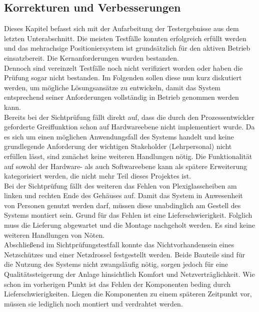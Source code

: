 \documentclass[../../../Bachelorarbeit.tex]{subfiles}
\begin{document}
\subsection{Korrekturen und Verbesserungen}
Dieses Kapitel befasst sich mit der Aufarbeitung der Testergebnisse aus dem letzten Unterabschnitt. Die meisten Testfälle konnten erfolgreich erfüllt werden und das mehrachsige Positioniersystem ist grundsätzlich für den aktiven Betrieb einsatzbereit. Die Kernanforderungen wurden bestanden.\\
Dennoch sind vereinzelt Testfälle noch nicht verifiziert worden oder haben die Prüfung sogar nicht bestanden. Im Folgenden sollen diese nun kurz diskutiert werden, um mögliche Lösungsansätze zu entwickeln, damit das System entsprechend seiner Anforderungen vollständig in Betrieb genommen werden kann.\\
Bereits bei der Sichtprüfung fällt direkt auf, dass die durch den Prozessentwickler geforderte Greiffunktion schon auf Hardwareebene nicht implementiert wurde. Da es sich um einen möglichen Anwendungsfall des Systems handelt und keine grundlegende Anforderung der wichtigen Stakeholder (Lehrpersonal) nicht erfüllen lässt, sind zunächst keine weiteren Handlungen nötig. Die Funktionalität auf sowohl der Hardware- als auch Softwareebene kann als spätere Erweiterung kategorisiert werden, die nicht mehr Teil dieses Projektes ist.\\
Bei der Sichtprüfung fällt des weiteren das Fehlen von Plexiglasscheiben am linken und rechten Ende des Gehäuses auf. Damit das System in Anwesenheit von Personen genutzt werden darf, müssen diese unabdinglich am Gestell des Systems montiert sein. Grund für das Fehlen ist eine Lieferschwierigkeit. Folglich muss die Lieferung abgewartet und die Montage nachgeholt werden. Es sind keine weiteren Handlungen von Nöten.\\
Abschließend im Sichtprüfungstestfall konnte das Nichtvorhandensein eines Netzschützes und einer Netzdrossel festgestellt werden. Beide Bauteile sind für die Nutzung des Systems nicht zwangsläufig nötig, sorgen jedoch für eine Qualitätssteigerung der Anlage hinsichtlich Komfort und Netzverträglichkeit. Wie schon im vorherigen Punkt ist das Fehlen der Komponenten beding durch Lieferschwierigkeiten. Liegen die Komponenten zu einem späteren Zeitpunkt vor, müssen sie lediglich noch montiert und verdrahtet werden.\\
\end{document}

